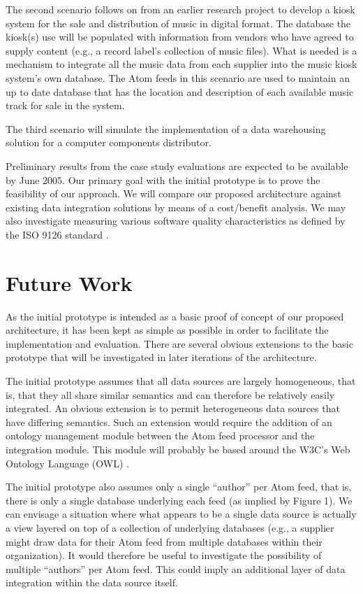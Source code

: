 \documentclass{CRPITStyle}
\begin{document}
The second scenario follows on from an earlier research project to
develop a kiosk system for the sale and distribution of music in digital
format. The database the kiosk(s) use will be populated with information
from vendors who have agreed to supply content (e.g., a record label's
collection of music files). What is needed is a mechanism to integrate
all the music data from each supplier into the music kiosk system's own
database. The Atom feeds in this scenario are used to maintain an up to
date database that has the location and description of each available
music track for sale in the system.

The third scenario will simulate the implementation of a data
warehousing solution for a computer components distributor.

Preliminary results from the case study evaluations are expected to be
available by June 2005. Our primary goal with the initial prototype is
to prove the feasibility of our approach. We will compare our proposed
architecture against existing data integration solutions by means of a
cost/benefit analysis. We may also investigate measuring various
software quality characteristics as defined by the ISO 9126 standard
\cite{ISO-2001-9126-1}.


\section{Future Work}

As the initial prototype is intended as a basic proof of concept of our
proposed architecture, it has been kept as simple as possible in order
to facilitate the implementation and evaluation. There are several
obvious extensions to the basic prototype that will be investigated in
later iterations of the architecture.

The initial prototype assumes that all data sources are largely
homogeneous, that is, that they all share similar semantics and can
therefore be relatively easily integrated. An obvious extension is to
permit heterogeneous data sources that have differing semantics. Such an
extension would require the addition of an ontology management module
between the Atom feed processor and the integration module. This module
will probably be based around the W3C's Web Ontology Language (OWL)
\cite{McGu-DL-2004-OWL}.

The initial prototype also assumes only a single ``author'' per Atom feed,
that is, there is only a single database underlying each feed (as
implied by Figure 1). We can envisage a situation where what appears to
be a single data source is actually a view layered on top of a
collection of underlying databases (e.g., a supplier might draw data for
their Atom feed from multiple databases within their organization). It
would therefore be useful to investigate the possibility of multiple
``authors'' per Atom feed. This could imply an additional layer of data
integration within the data source itself.
\end{document}
